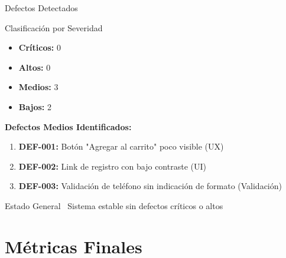 \documentclass[aspectratio=169]{beamer}
\begin{document}
\begin{frame}{Defectos Detectados}
\begin{block}{Clasificación por Severidad}
\begin{itemize}
    \item \textbf{Críticos:} 0
    \item \textbf{Altos:} 0
    \item \textbf{Medios:} 3
    \item \textbf{Bajos:} 2
\end{itemize}
\end{block}

\vspace{0.3cm}

\textbf{Defectos Medios Identificados:}
\begin{enumerate}
    \item \textbf{DEF-001:} Botón "Agregar al carrito" poco visible (UX)
    \item \textbf{DEF-002:} Link de registro con bajo contraste (UI)
    \item \textbf{DEF-003:} Validación de teléfono sin indicación de formato (Validación)
\end{enumerate}

\vspace{0.3cm}

\begin{alertblock}{Estado General}
\textcolor{successgreen}{\faCheckCircle~Sistema estable sin defectos críticos o altos}
\end{alertblock}
\end{frame}

\section{Métricas Finales}
\end{document}
